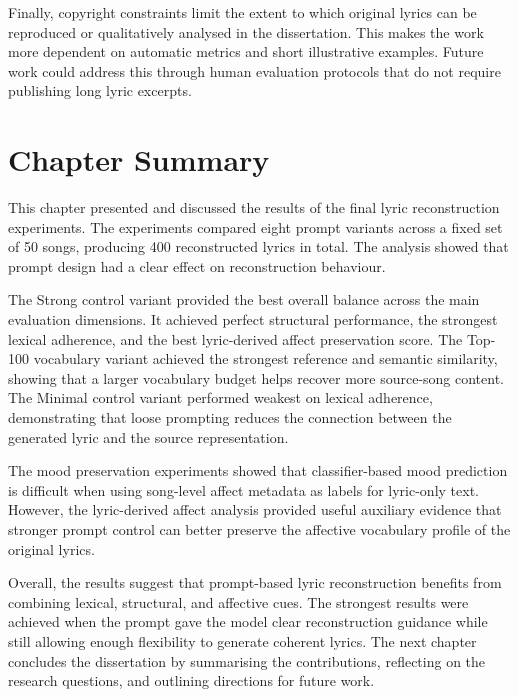 Finally, copyright constraints limit the extent to which original lyrics can be reproduced or qualitatively analysed in the dissertation. This makes the work more dependent on automatic metrics and short illustrative examples. Future work could address this through human evaluation protocols that do not require publishing long lyric excerpts.

\section{Chapter Summary}

This chapter presented and discussed the results of the final lyric reconstruction experiments. The experiments compared eight prompt variants across a fixed set of 50 songs, producing 400 reconstructed lyrics in total. The analysis showed that prompt design had a clear effect on reconstruction behaviour.

The Strong control variant provided the best overall balance across the main evaluation dimensions. It achieved perfect structural performance, the strongest lexical adherence, and the best lyric-derived affect preservation score. The Top-100 vocabulary variant achieved the strongest reference and semantic similarity, showing that a larger vocabulary budget helps recover more source-song content. The Minimal control variant performed weakest on lexical adherence, demonstrating that loose prompting reduces the connection between the generated lyric and the source representation.

The mood preservation experiments showed that classifier-based mood prediction is difficult when using song-level affect metadata as labels for lyric-only text. However, the lyric-derived affect analysis provided useful auxiliary evidence that stronger prompt control can better preserve the affective vocabulary profile of the original lyrics.

Overall, the results suggest that prompt-based lyric reconstruction benefits from combining lexical, structural, and affective cues. The strongest results were achieved when the prompt gave the model clear reconstruction guidance while still allowing enough flexibility to generate coherent lyrics. The next chapter concludes the dissertation by summarising the contributions, reflecting on the research questions, and outlining directions for future work.

